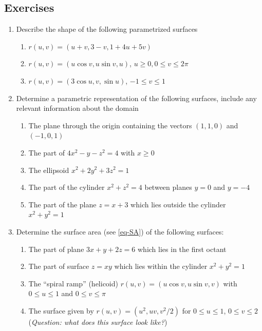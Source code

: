 \documentclass[12pt]{article}
\numberwithin{equation}{subsection}
\numberwithin{figure}{subsection}
\theoremstyle{note}
\begin{document}
{%

\subsection{Exercises}
\begin{enumerate}[label=\arabic*.]
\item Describe the shape of the following parametrized surfaces

\begin{enumerate}
	\item $r(u,v)=(u+v, 3-v, 1+4u+5v)$
	\item $r(u,v)=(u \cos v, u \sin v, u)$, $u\geq 0, 0\leq v\leq 2\pi$
	\item $r(u,v)=(3\cos u, v, \sin u)$, $-1\leq v\leq 1$
\end{enumerate}

\item Determine a parametric representation of the following surfaces, include any relevant information about the domain

\begin{enumerate}
	\item The plane through the origin containing the vectors $(1,1,0)$ and $(-1,0,1)$
	\item The part of $4x^2-y-z^2=4$ with $x\geq 0$
	\item The ellipsoid $x^2+2y^2+3z^2=1$
	\item The part of the cylinder $x^2+z^2=4$ between planes $y=0$ and $y=-4$
	\item The part of the plane $z=x+3$ which lies outside the cylinder $x^2+y^2=1$
\end{enumerate}

\item Determine the surface area (see \eqref{eq-SA}) of the following surfaces:
	
\begin{enumerate}
	\item The part of plane $3x+y+2z=6$ which lies in the first octant
	\item The part of surface $z=xy$ which lies within the cylinder $x^2+y^2=1$
	\item The ``spiral ramp'' (helicoid) $r(u,v)=(u\cos v, u\sin v, v)$ with $0\leq u\leq 1$ and $0\leq v\leq \pi$
	\item The surface given by $r(u,v)=(u^2, uv, v^2/2)$ for $0\leq u \leq 1$, $0\leq v\leq 2$ (\textit{Question: what does this surface look like?})
\end{enumerate}


\end{enumerate}}
\end{document}

